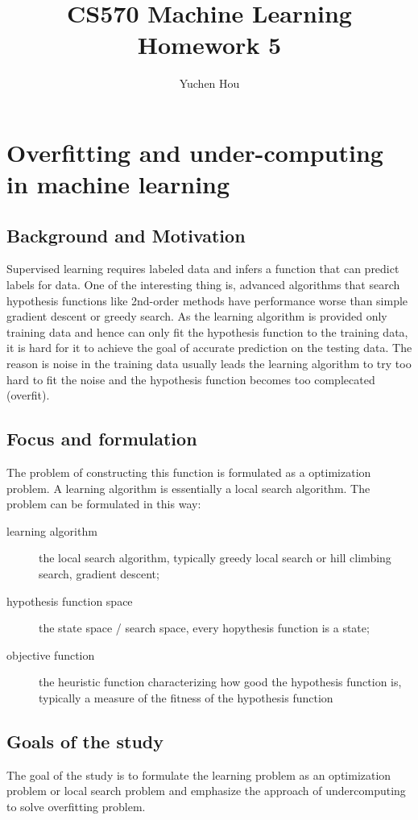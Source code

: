 \documentclass[12pt]{article}
\begin{document}
\title{CS570 Machine Learning Homework 5}
\author{Yuchen Hou}
\maketitle

\section{Overfitting and under-computing in machine learning}
\subsection{Background and Motivation}
Supervised learning requires labeled data and infers a function that can predict labels for data\cite{dietterich1995overfitting}. One of the interesting thing is, advanced algorithms that search hypothesis functions like 2nd-order methods have performance worse than simple gradient descent or greedy search. As the learning algorithm is provided only training data and hence can only fit the hypothesis function to the training data, it is hard for it to achieve the goal of accurate prediction on the testing data. The reason is noise in the training data usually leads the learning algorithm to try too hard to fit the noise and the hypothesis function becomes too complecated (overfit).
\subsection{Focus and formulation}
The problem of constructing this function is formulated as a optimization problem. A learning algorithm is essentially a local search algorithm. The problem can be formulated in this way:
\begin{description}
  \item[learning algorithm] the local search algorithm, typically greedy local search or hill climbing search, gradient descent;
  \item[hypothesis function space] the state space / search space, every hopythesis function is a state;
  \item[objective function] the heuristic function characterizing how good the hypothesis function is, typically a measure of the fitness of the hypothesis function
\end{description}
\subsection{Goals of the study}
The goal of the study is to formulate the learning problem as an optimization problem or local search problem and  emphasize the approach of undercomputing to solve overfitting problem.
\end{document}
